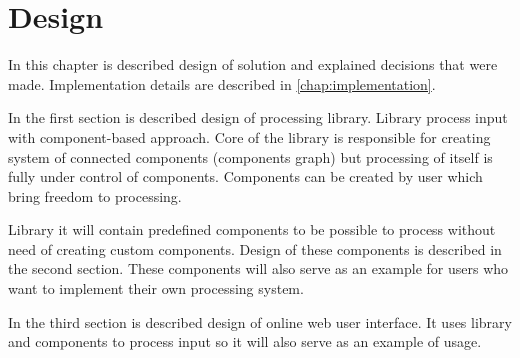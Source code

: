 
\chapter{Design}

In this chapter is described design of solution and explained decisions that were made.
Implementation details are described in \autoref{chap:implementation}.

In the first section is described design of \lsystem processing library.
Library process input with component-based approach.
Core of the library is responsible for creating system of connected components (components graph) but processing of \lsystem itself is fully under control of components.
Components can be created by user which bring freedom to \lsystem processing.

Library it will contain predefined components to be possible to process \lsystems without need of creating custom components.
Design of these components is described in the second section.
These components will also serve as an example for users who want to implement their own processing system.

In the third section is described design of online web user interface.
It uses library and components to process input so it will also serve as an example of usage.





\clearpage


\clearpage


















